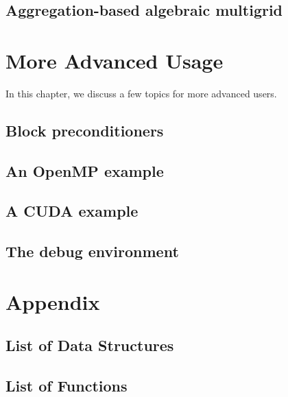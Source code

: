 \documentclass[11pt]{memoir}
\begin{document}
\section{Aggregation-based algebraic multigrid}\label{sec:samg}

\chapter{More Advanced Usage}\label{ch:advanced}

In this chapter, we discuss a few topics for more advanced users. 

\section{Block preconditioners}\label{sec:block}

\section{An OpenMP example}\label{sec:mop}

\section{A CUDA example}\label{sec:cuda}

\section{The debug environment}\label{sec:debug}


\chapter*{Appendix}\label{ch:append}

\section*{List of Data Structures}

\section*{List of Functions}


\newpage


\end{document}
